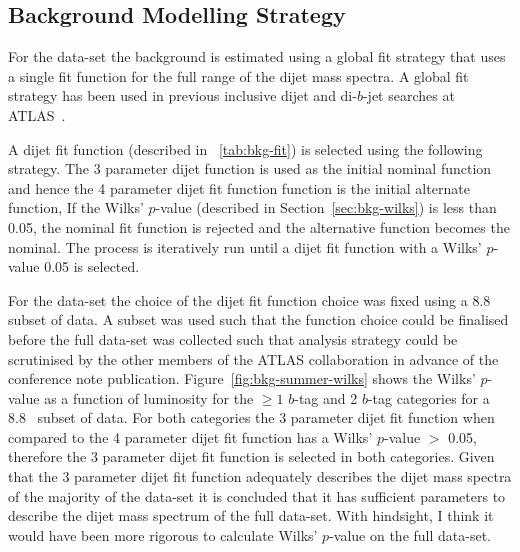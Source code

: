 \subsection{Background Modelling Strategy}
\label{sec:bkg-summer_global}

For the \summer{} data-set the background is estimated using a global fit strategy that
uses a single fit function for the full range of the dijet mass spectra.
A global fit strategy has been used in previous inclusive dijet and di-$b$-jet searches at ATLAS~\cite{dijet-mori16_paper,dibjet-mori16_paper}.

A dijet fit function (described in ~\ref{tab:bkg-fit}) is selected using the following strategy.
The 3 parameter dijet function is used as the initial nominal function and hence the 4 parameter dijet fit function function is the initial alternate function,
If the Wilks' \mbox{$p$-value} (described in Section~\ref{sec:bkg-wilks}) is less than 0.05,
the nominal fit function is rejected and the alternative function becomes the nominal.
The process is iteratively run until a dijet fit function with a Wilks' \mbox{$p$-value} \gt{} 0.05 is selected.

For the \summer{} data-set the choice of the dijet fit function choice was fixed using a 8.8~\ifb{} subset of data.
A subset was used such that the function choice could be finalised before the full data-set was collected
such that analysis strategy could be scrutinised by the other members of the ATLAS collaboration in advance of the conference note publication.
Figure~\ref{fig:bkg-summer-wilks} shows the Wilks' \mbox{$p$-value} as a function of luminosity
for the $\geq1$ $b$-tag and 2 $b$-tag categories for a 8.8~\ifb{} subset of data.
For both categories the 3 parameter dijet fit function when compared to the 4 parameter dijet fit function
has a Wilks' \mbox{$p$-value} $>$ 0.05,
therefore the 3 parameter dijet fit function is selected in both categories.
Given that the 3 parameter dijet fit function adequately describes the dijet mass spectra of the
majority of the data-set it is concluded that it has sufficient parameters to describe the dijet mass spectrum of the full data-set.
With hindsight, I think it would have been more rigorous to calculate Wilks' \mbox{$p$-value} on the full data-set.

